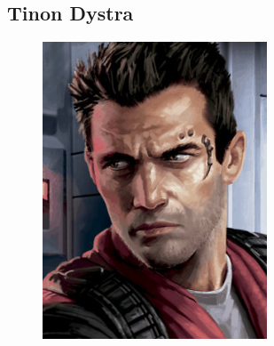 \clearpage
\onecolumn
\label{sec:r4-3d}

\twocolumn 
\clearpage
\subsection{Tinon Dystra} \label{sec:tinon-dystra}
\begin{figure}[h!]
    \centering
    \includegraphics[height=250pt]{_img/pnjs/tinon-dystra.jpg}
\end{figure}

